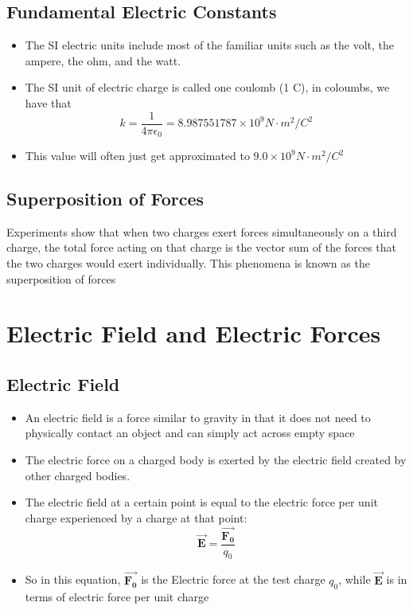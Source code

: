 \documentclass[11pt, a4paper]{article}
\begin{document}
\subsection{Fundamental Electric Constants}
\begin{itemize}
    \item The SI electric units include most of the familiar units such as the volt, the
        ampere, the ohm, and the watt.
    \item The SI unit of electric charge is called one coulomb (1 C), in coloumbs, we
        have that
        \begin{equation}
            k = \frac{1}{4\pi\epsilon_0} = 8.987551787 \times 10^9 N\cdot m^2 / C^2
        \end{equation}
    \item This value will often just get approximated to $9.0\times 10^9 N \cdot m^2 /C^2$
\end{itemize}
\subsection{Superposition of Forces}
Experiments show that when two charges exert forces simultaneously on a third charge, the
total force acting on that charge is the vector sum of the forces that the two charges
would exert individually. This phenomena is known as the superposition of forces
\section[21.4, Electric Field and Electric Forces]{Electric Field and Electric Forces}
\subsection{Electric Field}
\begin{itemize}
    \item An electric field is a force similar to gravity in that it does not need to
        physically contact an object and can simply act across empty space
    \item The electric force on a charged body is exerted by the electric field created by
        other charged bodies.
    \item The electric field at a certain point is equal to the electric force per unit
        charge experienced by a charge at that point:
        \begin{equation}
            \vec{\mathbf{E}} = \frac{\vec{\mathbf{F_0}}}{q_0}
        \end{equation}
    \item So in this equation, $\vec{\mathbf{F_0}}$ is the Electric force at the test
        charge $q_0$, while $\mathbf{\vec{E}}$ is in terms of electric force per unit
        charge
\end{itemize}
\end{document}
